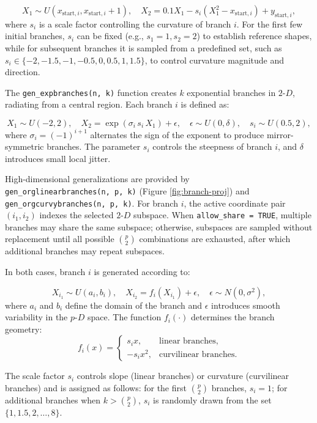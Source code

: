 \[
X_1 \sim U(x_{\text{start},i}, x_{\text{start},i}+1), \quad X_2 = 0.1 X_1 - s_i (X_1^2 - x_{\text{start},i}) + y_{\text{start},i},
\]where \(s_i\) is a scale factor controlling the curvature of branch \(i\). For the first few initial branches, \(s_i\) can be fixed (e.g., \(s_1 = 1, s_2 = 2\)) to establish reference shapes, while for subsequent branches it is sampled from a predefined set, such as \(s_i \in \{-2, -1.5, -1, -0.5, 0, 0.5, 1, 1.5\}\), to control curvature magnitude and direction.

The \texttt{gen\_expbranches(n,\ k)} function creates \(k\) exponential branches in \(2\text{-}D\), radiating from a central region. Each branch \(i\) is defined as:

\[
X_1 \sim U(-2,2), \quad X_2 = \exp(\sigma_i \, s_i \, X_1) + \epsilon, \quad \epsilon \sim U(0, \delta), \quad s_i \sim U(0.5,2),
\]where \(\sigma_i = (-1)^{i+1}\) alternates the sign of the exponent to produce mirror-symmetric branches. The parameter \(s_i\) controls the steepness of branch \(i\), and \(\delta\) introduces small local jitter.

High-dimensional generalizations are provided by \texttt{gen\_orglinearbranches(n,\ p,\ k)} (Figure \ref{fig:branch-proj}) and \texttt{gen\_orgcurvybranches(n,\ p,\ k)}. For branch
\(i\), the active coordinate pair \((i_1, i_2)\) indexes the selected \(2\text{-}D\) subspace. When \texttt{allow\_share\ =\ TRUE}, multiple branches may share the same subspace; otherwise, subspaces are sampled without replacement until all possible \(\binom{p}{2}\) combinations are exhausted, after which additional branches may repeat subspaces.

In both cases, branch \(i\) is generated according to:

\[
X_{i_1} \sim U(a_i, b_i), \quad
X_{i_2} = f_i(X_{i_1}) + \epsilon, \quad
\epsilon \sim N(0, \sigma^2),
\]where \(a_i\) and \(b_i\) define the domain of the branch and \(\epsilon\) introduces smooth variability in the \(p\text{-}D\) space. The function \(f_i(\cdot)\) determines the branch geometry:
\[
f_i(x) =
\begin{cases}
s_i x, & \text{linear branches}, \\
-s_i x^2, & \text{curvilinear branches}.
\end{cases}
\]

The scale factor \(s_i\) controls slope (linear branches) or curvature (curvilinear branches) and is assigned as follows: for the first \(\binom{p}{2}\) branches, \(s_i = 1\); for additional branches when \(k > \binom{p}{2}\), \(s_i\) is randomly drawn from the set \(\{1, 1.5, 2, \dots, 8\}\).

